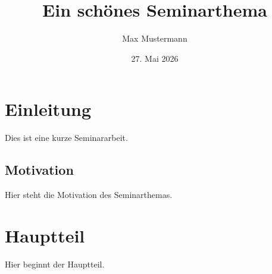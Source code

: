 \documentclass[11pt]{bhthesis}
\title{Ein schönes Seminarthema}
\author{Max Mustermann}
\date{27. Mai 2026}
\begin{document}
\maketitle
\tableofcontents

\chapter{Einleitung}

Dies ist eine kurze Seminararbeit.

\section{Motivation}

Hier steht die Motivation des Seminarthemas.

\chapter{Hauptteil}

Hier beginnt der Hauptteil.
\end{document}
